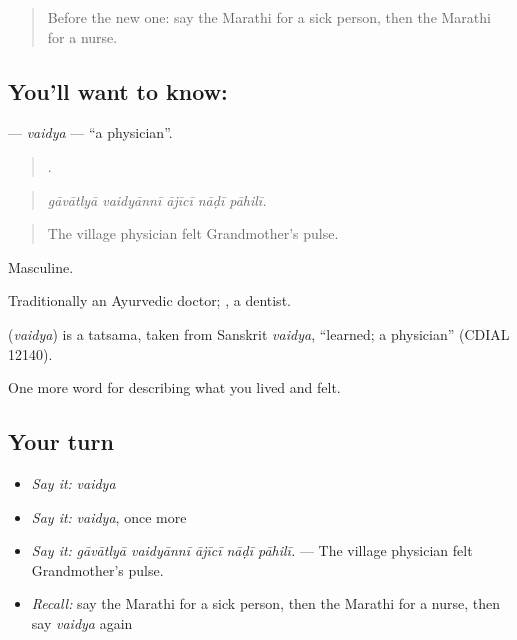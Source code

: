 \label{lesson:MR-C488-vaidya}



\begin{quote}
Before the new one: say the Marathi for a sick person, then the Marathi for a nurse.
\end{quote}

\subsection*{You'll want to know: }
\textbf{} — \emph{vaidya} — \textquotedblleft{}a physician\textquotedblright{}.

\begin{quote}
    .
\end{quote}

\begin{quote}
\emph{gāvātlyā vaidyānnī ājīcī nāḍī pāhilī.}
\end{quote}

\begin{quote}
The village physician felt Grandmother's pulse.
\end{quote}

Masculine.

Traditionally an Ayurvedic doctor; , a dentist.

\begin{cousinweb}
\textbf{} (\emph{vaidya}) is a tatsama, taken from Sanskrit \emph{vaidya}, \textquotedblleft{}learned; a physician\textquotedblright{} (CDIAL 12140).
\end{cousinweb}

\begin{grammarlens}[title={What you've built}]
One more word for describing what you lived and felt.
\end{grammarlens}

\subsection*{Your turn}
\begin{itemize}
\raggedright
  \item \emph{Say it:} \emph{vaidya}
  \item \emph{Say it:} \emph{vaidya}, once more
  \item \emph{Say it:} \emph{gāvātlyā vaidyānnī ājīcī nāḍī pāhilī.} — The village physician felt Grandmother's pulse.
  \item \emph{Recall:} say the Marathi for a sick person, then the Marathi for a nurse, then say \emph{vaidya} again
\end{itemize}

